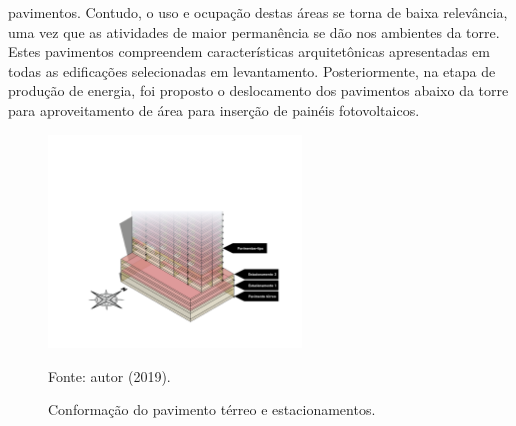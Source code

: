 pavimentos. Contudo, o uso e ocupação destas áreas se torna de baixa relevância, uma vez que 
as atividades de maior permanência se dão nos ambientes da torre.\vspace*{0.3cm} \newline
Estes pavimentos compreendem características arquitetônicas apresentadas em todas as 
edificações selecionadas em levantamento. Posteriormente, na etapa de produção de energia, 
foi proposto o deslocamento dos pavimentos abaixo da torre para aproveitamento de área para 
inserção de painéis fotovoltaicos.
    \begin{figure}[ht]
        \centering
        \caption{\small Conformação do pavimento térreo e estacionamentos.}
        \includegraphics[width=0.6\textwidth]{figures/fig12-base_torre-1.png}
        \begin{flushleft}
            \par \small Fonte: autor (2019).
        \end{flushleft}
        \label{fig:figura12}
    \end{figure}\newline